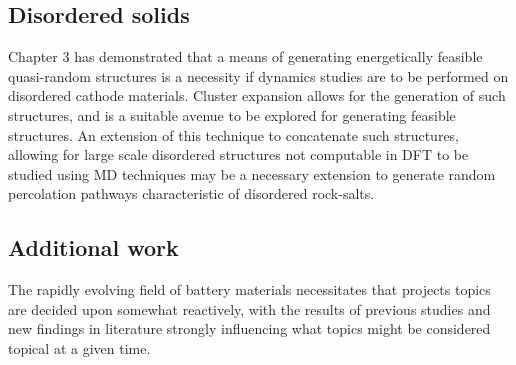 \subsection{Disordered solids}
Chapter 3 has demonstrated that a means of generating energetically feasible quasi-random structures is a necessity if dynamics studies are to be performed on disordered cathode materials.
Cluster expansion\cite{Wood2015} allows for the generation of such structures, and is a suitable avenue to be explored for generating feasible structures.
An extension of this technique to concatenate such structures, allowing for large scale disordered structures not computable in DFT to be studied using MD techniques may be a necessary extension to generate random percolation pathways characteristic of disordered rock-salts.

\subsection{Additional work}
The rapidly evolving field of battery materials necessitates that projects topics are decided upon somewhat reactively, with the results of previous studies and new findings in literature strongly influencing what topics might be considered topical at a given time.

